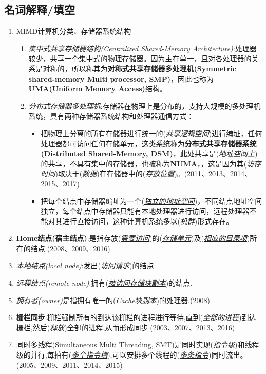 \documentclass[a4paper]{ctexart}
\newcommand{\blank}[1]{(\emph{\underline{#1}})}
\begin{document}
\subsection{名词解释/填空}
\begin{enumerate}
  \item MIMD计算机分类、存储器系统结构
  \begin{enumerate}
    \item \emph{集中式共享存储器结构(Centralized Shared-Memory Architecture)}:处理器较少，共享一个集中式的物理存储器。因为主存单一，且对各处理器的关系是对称的，所以称其为\textbf{对称式共享存储器多处理机(Symmetric shared-memory Multi processor, SMP)}，因此也称为\textbf{UMA(Uniform Memory Access)}结构。
    \item \emph{分布式存储器多处理机}:存储器在物理上是分布的，支持大规模的多处理机系统，具有两种存储器系统结构和处理器通信方式：
    \begin{itemize}
      \item 把物理上分离的所有存储器进行统一的\blank{共享逻辑空间}进行编址，任何处理器都可访问任何存储单元，这类系统称为\textbf{分布式共享存储器系统(Distributed Shared-Memory, DSM)}，此处共享是\blank{地址空间上}的共享，不具有集中的存储器，也被称为\textbf{NUMA}，，这是因为其\blank{访存时间}取决于\blank{数据}在存储器中的\blank{存放位置}。(2011、2013、2014、2015、2017)
      \item 把每个结点中存储器编址为一个\blank{独立的地址空间}，不同结点地址空间独立，每个结点中存储器只能有本地处理器进行访问，远程处理器不能对其进行直接访问，这种计算机系统多以\blank{机群}形式存在。
    \end{itemize}
  \end{enumerate}
  \item \textbf{Home结点(宿主结点)}:是指存放\blank{需要访问}的\blank{存储单元}及\blank{相应的目录项}所在的结点.(2008、2009、2016)
  \item \emph{本地结点(local node)}:发出\blank{访问请求}的结点.
  \item \emph{远程结点(remote node)}:拥有\blank{被访问存储块副本}的结点.
  \item \emph{拥有者(owner)}是指拥有唯一的\blank{Cache块副本}的处理器.(2008)
  \item \textbf{栅栏同步}:栅栏强制所有的到达该栅栏的进程进行等待,直到(\emph{\underline{全部的进程}})到达栅栏,然后(\emph{\underline{释放}})全部的进程,从而形成同步.(2003、2007、2013、2016)
  \item 同时多线程(Simultaneous Multi Threading, SMT)是同时实现(\emph{\underline{指令级}})和线程级的并行,每拍有(\emph{\underline{多个指令槽}}),可以安排多个线程的(\emph{\underline{多条指令}})同时流出。(2005、2009、2011、2014、2015)

\end{enumerate}
\end{document}

